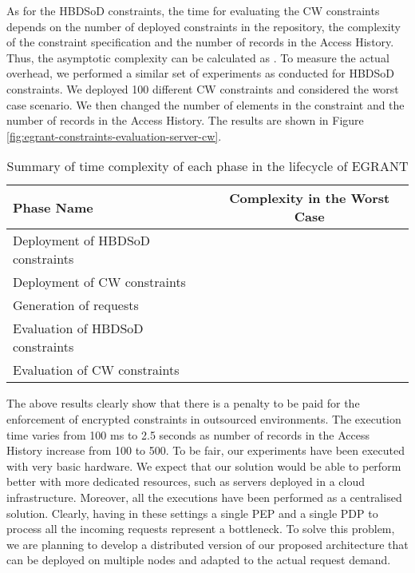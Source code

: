 \documentclass[epsfig,a4paper,11pt,titlepage]{book}
\numberwithin{algorithm}{chapter}
\begin{document}
As for the \gls{HBDSoD} constraints, the time for evaluating the \gls{CW} constraints depends on the number of deployed constraints in the repository, the complexity of the constraint specification and the number of records in the Access History. Thus, the asymptotic complexity can be calculated as . To measure the actual overhead, we performed a similar set of experiments as conducted for \gls{HBDSoD} constraints. We deployed 100 different \gls{CW} constraints and considered the worst case scenario. We then changed the number of elements in the constraint and the number of records in the Access History. The results are shown in Figure \ref{fig:egrant-constraints-evaluation-server-cw}.


\begin{table} [htp]
\centering
\caption[Time complexity of each phase in the lifecycle of E-GRANT]{Summary of time complexity of each phase in the lifecycle of \gls{EGRANT}}
\label{tab:egrant-complexity-summary}

\begin{tabular}{ |l|c| } 

\hline

\textbf{Phase Name} & \textbf{Complexity in the Worst Case} \\ \hline

Deployment of \gls{HBDSoD} constraints &  \\ \hline

Deployment of \gls{CW} constraints &  \\ \hline

Generation of requests &  \\ \hline

Evaluation of \gls{HBDSoD} constraints &  \\ \hline

Evaluation of \gls{CW} constraints &  \\ \hline

\end{tabular}

\end{table}


The above results clearly show that there is a penalty to be paid for the enforcement of encrypted constraints in outsourced environments. The execution time varies from 100 \gls{ms} to 2.5 seconds as number of records in the Access History increase from 100 to 500. To be fair, our experiments have been executed with very basic hardware. We expect that our solution would be able to perform better with more dedicated resources, such as servers deployed in a cloud infrastructure. Moreover, all the executions have been performed as a centralised solution. Clearly, having in these settings a single \gls{PEP} and a single \gls{PDP} to process all the incoming requests represent a bottleneck. To solve this problem, we are planning to develop a distributed version of our proposed architecture that can be deployed on multiple nodes and adapted to the actual request demand.
\end{document}
